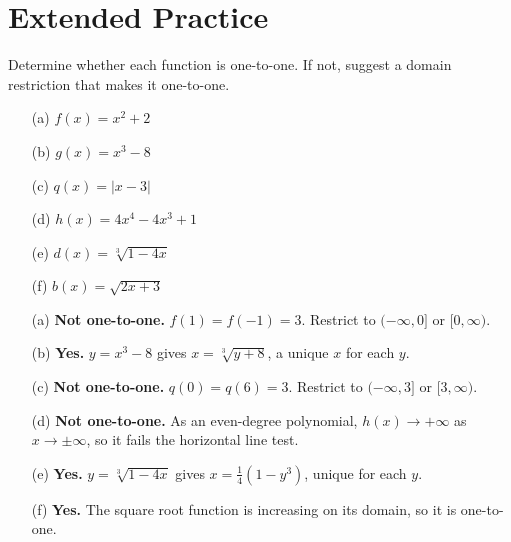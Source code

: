 \documentclass{ximera}
\begin{document}
\bigskip
\section*{Extended Practice}

\begin{problem}
Determine whether each function is one-to-one. If not, suggest a domain restriction that makes it one-to-one.
\begin{enumerate}
  \item[(a)] $f(x) = x^2+2$
  \item[(b)] $g(x) = x^3-8$
  \item[(c)] $q(x) = |x-3|$
  \item[(d)] $h(x) = 4x^4-4x^3+1$
  \item[(e)] $d(x) = \sqrt[3]{1-4x}$
  \item[(f)] $b(x) = \sqrt{2x+3}$
\end{enumerate}

\begin{solution}
\begin{enumerate}
  \item[(a)] \textbf{Not one-to-one.} $f(1)=f(-1)=3$. Restrict to $(-\infty,0]$ or $[0,\infty)$.
  \item[(b)] \textbf{Yes.} $y=x^3-8$ gives $x=\sqrt[3]{y+8}$, a unique $x$ for each $y$.
  \item[(c)] \textbf{Not one-to-one.} $q(0)=q(6)=3$. Restrict to $(-\infty,3]$ or $[3,\infty)$.
  \item[(d)] \textbf{Not one-to-one.} As an even-degree polynomial, $h(x)\to+\infty$ as $x\to\pm\infty$, so it fails the horizontal line test.
  \item[(e)] \textbf{Yes.} $y=\sqrt[3]{1-4x}$ gives $x=\tfrac{1}{4}(1-y^3)$, unique for each $y$.
  \item[(f)] \textbf{Yes.} The square root function is increasing on its domain, so it is one-to-one.
\end{enumerate}
\end{solution}
\end{problem}
\end{document}

